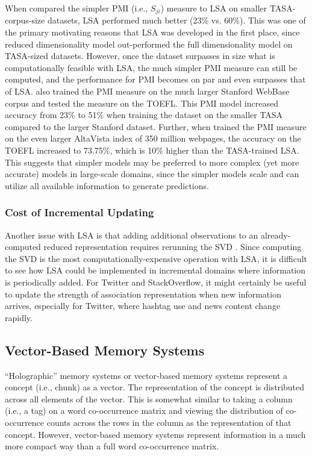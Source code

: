 \documentclass[man,floatsintext,donotrepeattitle]{apa6}
\begin{document}
When \textcite{Budiu2007} compared the simpler PMI (i.e., $S_{ji}$) measure to LSA on smaller TASA-corpus-size datasets, LSA performed much better (23\% vs. 60\%).
This was one of the primary motivating reasons that LSA was developed in the first place, since reduced dimensionality model out-performed the full dimensionality model on TASA-sized datasets.
However, once the dataset surpasses in size what is computationally feasible with LSA, the much simpler PMI measure can still be computed, and the performance for PMI becomes on par and even surpasses that of LSA.
\textcite{Budiu2007} also trained the PMI measure on the much larger Stanford WebBase corpus and tested the measure on the TOEFL.
This PMI model increased accuracy from 23\% to 51\% when training the dataset on the smaller TASA compared to the larger Stanford dataset.
Further, when \textcite{Turney2001} trained the PMI measure on the even larger AltaVista index of 350 million webpages, the accuracy on the TOEFL increased to 73.75\%, which is 10\% higher than the TASA-trained LSA.
This suggests that simpler models may be preferred to more complex (yet more accurate) models in large-scale domains, since the simpler models scale and can utilize all available information to generate predictions.

\subsubsection{Cost of Incremental Updating}

Another issue with LSA is that adding additional observations to an already-computed reduced representation requires rerunning the SVD \parencite{Farahat2004}.
Since computing the SVD is the most computationally-expensive operation with LSA, it is difficult to see how LSA could be implemented in incremental domains where information is periodically added.
For Twitter and StackOverflow, it might certainly be useful to update the strength of association representation when new information arrives, especially for Twitter, where hashtag use and news content change rapidly.

\subsection{Vector-Based Memory Systems}

``Holographic'' memory systems \parencite{Plate1995} or vector-based memory systems represent a concept (i.e., chunk) as a vector.
The representation of the concept is distributed across all elements of the vector.
This is somewhat similar to taking a column (i.e., a tag) on a word co-occurrence matrix and viewing the distribution of co-occurrence counts across the rows in the column as the representation of that concept.
However, vector-based memory systems represent information in a much more compact way than a full word co-occurrence matrix.
\end{document}
